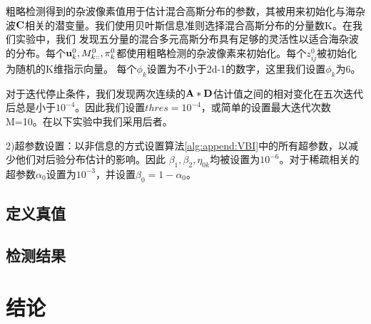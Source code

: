 粗略检测得到的杂波像素值用于估计混合高斯分布的参数，其被用来初始化与海杂波$\bf{C}$相关的潜变量。我们使用贝叶斯信息准则选择混合高斯分布的分量数K。在我们实验中，我们
发现五分量的混合多元高斯分布具有足够的灵活性以适合海杂波的分布。每个${\bf{u}}_k^0,M_{k::}^0,\pi _k^0$都使用粗略检测的杂波像素来初始化。每个$z_{ij}^0$被初始化为随机的K维指示向量。
每个${\phi _k}$设置为不小于2d-1的数字，这里我们设置${\phi _k}$为6。

对于迭代停止条件，我们发现两次连续的$\bf{A}*\bf{D}$估计值之间的相对变化在五次迭代后总是小于$10^{-4}$。因此我们设置$thres=10^{-4}$，或简单的设置最大迭代次数M=10。在以下实验中我们采用后者。

2)超参数设置：以非信息的方式设置算法\ref{alg:append:VBI}中的所有超参数，以减少他们对后验分布估计的影响。因此
$\beta_1,\beta_2,{\eta_{0k}}$均被设置为$10^{-6}$。对于稀疏相关的超参数$\alpha_0$设置为$10^{-3}$，并设置$\beta_0=1-\alpha_0$。
\subsection{定义真值}
\subsection{检测结果}
\section{结论}

